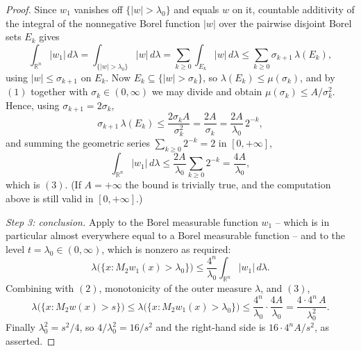 \begin{proof}
Since $w_1$ vanishes off $\{|w| > \lambda_0\}$ and equals $w$ on it, countable
additivity of the integral of the nonnegative Borel function $|w|$ over the
pairwise disjoint Borel sets $E_k$ gives
\[
  \int_{\mathbb{R}^n}|w_1|\,d\lambda
    = \int_{\{|w|>\lambda_0\}}|w|\,d\lambda
    = \sum_{k\geq0}\int_{E_k}|w|\,d\lambda
    \leq \sum_{k\geq0}\sigma_{k+1}\,\lambda(E_k) ,
\]
using $|w| \leq \sigma_{k+1}$ on $E_k$.  Now $E_k \subseteq \{|w| > \sigma_k\}$,
so $\lambda(E_k) \leq \mu(\sigma_k)$, and by $(1)$ together with
$\sigma_k \in (0,\infty)$ we may divide and obtain
$\mu(\sigma_k) \leq A/\sigma_k^2$.  Hence, using
$\sigma_{k+1} = 2\sigma_k$,
\[
  \sigma_{k+1}\,\lambda(E_k)
    \leq \frac{2\sigma_k A}{\sigma_k^2}
    = \frac{2A}{\sigma_k}
    = \frac{2A}{\lambda_0}\,2^{-k} ,
\]
and summing the geometric series $\sum_{k\geq0}2^{-k} = 2$ in $[0,+\infty]$,
\[
  \int_{\mathbb{R}^n}|w_1|\,d\lambda
    \leq \frac{2A}{\lambda_0}\sum_{k\geq0}2^{-k}
    = \frac{4A}{\lambda_0} ,
\]
which is $(3)$.  (If $A = +\infty$ the bound is trivially true, and the
computation above is still valid in $[0,+\infty]$.)

\emph{Step 3: conclusion.}
Apply  to the Borel measurable function $w_1$ --
which is in particular almost everywhere equal to a Borel measurable function --
and to the level $t = \lambda_0 \in (0,\infty)$, which is nonzero as required:
\[
  \lambda\bigl(\{x : M_2w_1(x) > \lambda_0\}\bigr)
    \leq \frac{4^n}{\lambda_0}\int_{\mathbb{R}^n}|w_1|\,d\lambda .
\]
Combining with $(2)$, monotonicity of the outer measure $\lambda$, and $(3)$,
\[
  \lambda\bigl(\{x : M_2w(x) > s\}\bigr)
    \leq \lambda\bigl(\{x : M_2w_1(x) > \lambda_0\}\bigr)
    \leq \frac{4^n}{\lambda_0}\cdot\frac{4A}{\lambda_0}
    = \frac{4\cdot4^n\,A}{\lambda_0^2} .
\]
Finally $\lambda_0^2 = s^2/4$, so $4/\lambda_0^2 = 16/s^2$ and the right-hand
side is $16\cdot4^nA/s^2$, as asserted.
\end{proof}
